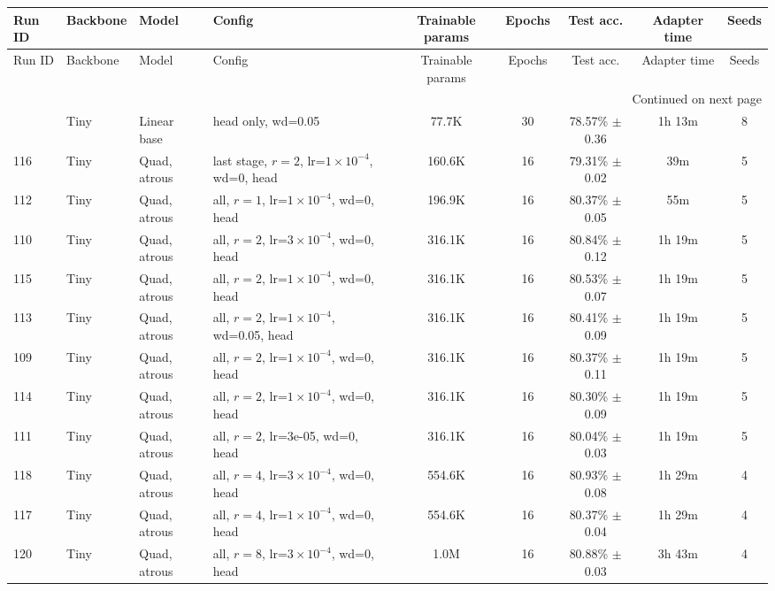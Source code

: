 \begingroup
\scriptsize
\setlength{\tabcolsep}{3pt}
\renewcommand{\arraystretch}{0.9}

\begin{longtable}{llllccccc}
\toprule
Run ID & Backbone & Model & Config & Trainable params & Epochs & Test acc. & Adapter time & Seeds \\
\midrule
\endfirsthead
\toprule
Run ID & Backbone & Model & Config & Trainable params & Epochs & Test acc. & Adapter time & Seeds \\
\midrule
\endhead
\midrule
\multicolumn{9}{r}{Continued on next page} \\
\midrule
\endfoot
\bottomrule
\endlastfoot
000 & Tiny & Linear base & head only, wd=0.05 & 77.7K & 30 & 78.57\% $\pm$ 0.36 & 1h 13m & 8 \\
116 & Tiny & Quad, atrous & last stage, $r=2$, lr=$1{\times}10^{-4}$, wd=0, head & 160.6K & 16 & 79.31\% $\pm$ 0.02 & 39m & 5 \\
112 & Tiny & Quad, atrous & all, $r=1$, lr=$1{\times}10^{-4}$, wd=0, head & 196.9K & 16 & 80.37\% $\pm$ 0.05 & 55m & 5 \\
110 & Tiny & Quad, atrous & all, $r=2$, lr=$3{\times}10^{-4}$, wd=0, head & 316.1K & 16 & 80.84\% $\pm$ 0.12 & 1h 19m & 5 \\
115 & Tiny & Quad, atrous & all, $r=2$, lr=$1{\times}10^{-4}$, wd=0, head & 316.1K & 16 & 80.53\% $\pm$ 0.07 & 1h 19m & 5 \\
113 & Tiny & Quad, atrous & all, $r=2$, lr=$1{\times}10^{-4}$, wd=0.05, head & 316.1K & 16 & 80.41\% $\pm$ 0.09 & 1h 19m & 5 \\
109 & Tiny & Quad, atrous & all, $r=2$, lr=$1{\times}10^{-4}$, wd=0, head & 316.1K & 16 & 80.37\% $\pm$ 0.11 & 1h 19m & 5 \\
114 & Tiny & Quad, atrous & all, $r=2$, lr=$1{\times}10^{-4}$, wd=0, head & 316.1K & 16 & 80.30\% $\pm$ 0.09 & 1h 19m & 5 \\
111 & Tiny & Quad, atrous & all, $r=2$, lr=3e-05, wd=0, head & 316.1K & 16 & 80.04\% $\pm$ 0.03 & 1h 19m & 5 \\
118 & Tiny & Quad, atrous & all, $r=4$, lr=$3{\times}10^{-4}$, wd=0, head & 554.6K & 16 & 80.93\% $\pm$ 0.08 & 1h 29m & 4 \\
117 & Tiny & Quad, atrous & all, $r=4$, lr=$1{\times}10^{-4}$, wd=0, head & 554.6K & 16 & 80.37\% $\pm$ 0.04 & 1h 29m & 4 \\
120 & Tiny & Quad, atrous & all, $r=8$, lr=$3{\times}10^{-4}$, wd=0, head & 1.0M & 16 & 80.88\% $\pm$ 0.03 & 3h 43m & 4 \\

\end{longtable}

